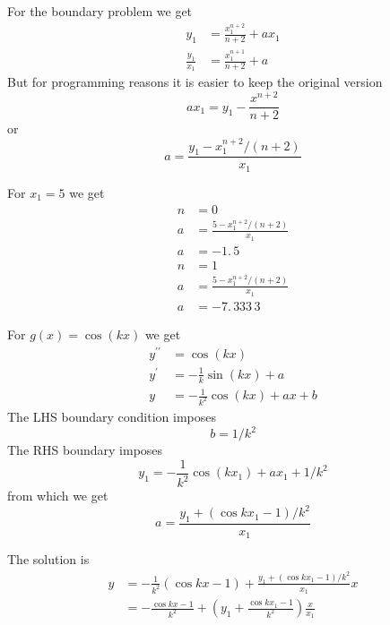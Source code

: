 \documentclass[12pt]{article}%
\begin{document}
For the boundary problem we get%
\begin{align}
y_{1}  &  =\frac{x_{1}^{n+2}}{n+2}+ax_{1}\\
\frac{y_{1}}{x_{1}}  &  =\frac{x_{1}^{n+1}}{n+2}+a
\end{align}
But for programming reasons it is easier to keep the original version%
\begin{equation}
ax_{1}=y_{1}-\frac{x^{n+2}}{n+2}%
\end{equation}
or%
\begin{equation}
a=\frac{y_{1}-x_{1}^{n+2}/\left(  n+2\right)  }{x_{1}}%
\end{equation}


For $x_{1}=5$ we get%
\begin{align}
n  &  =0\\
a  &  =\frac{5-x_{1}^{n+2}/\left(  n+2\right)  }{x_{1}}\\
a  &  =-1.\,\allowbreak5\\
n  &  =1\\
a  &  =\frac{5-x_{1}^{n+2}/\left(  n+2\right)  }{x_{1}}\\
a  &  =-7.\,\allowbreak333\,3
\end{align}


For $g\left(  x\right)  =\cos\left(  kx\right)  $ we get%
\begin{align}
y^{\prime\prime}  &  =\cos\left(  kx\right) \\
y^{\prime}  &  =-\frac{1}{k}\sin\left(  kx\right)  +a\\
y  &  =-\frac{1}{k^{2}}\cos\left(  kx\right)  +ax+b
\end{align}
The LHS boundary condition imposes%
\begin{equation}
b=1/k^{2}%
\end{equation}
The RHS boundary imposes%
\begin{equation}
y_{1}=-\frac{1}{k^{2}}\cos\left(  kx_{1}\right)  +ax_{1}+1/k^{2}%
\end{equation}
from which we get%
\begin{equation}
a=\frac{y_{1}+\left(  \cos kx_{1}-1\right)  /k^{2}}{x_{1}}%
\end{equation}


The solution is%
\begin{align}
y  &  =-\frac{1}{k^{2}}\left(  \cos kx-1\right)  +\frac{y_{1}+\left(  \cos
kx_{1}-1\right)  /k^{2}}{x_{1}}x\\
&  =-\frac{\cos kx-1}{k^{2}}+\left(  y_{1}+\frac{\cos kx_{1}-1}{k^{2}}\right)
\frac{x}{x_{1}}%
\end{align}
\end{document}
